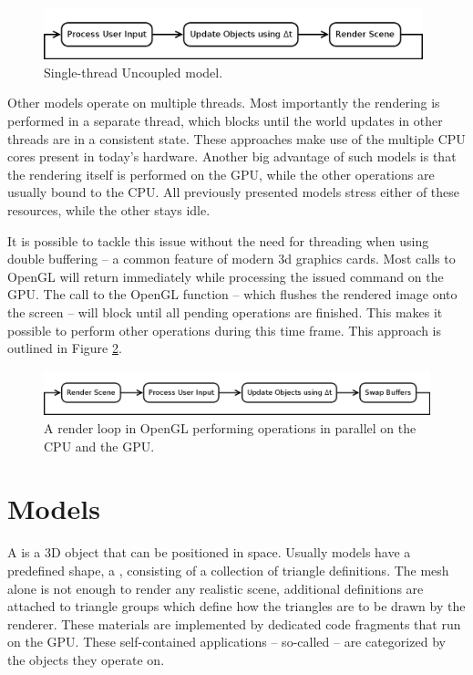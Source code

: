 	\begin{figure}[htbp]
		\centering
		\includegraphics[width=11cm]{images/renderloop-dynamic.png}
		\caption{Single-thread Uncoupled model.}
		\label{fig:RenderLoopDynamic}
	\end{figure}

	Other models operate on multiple threads. Most importantly the rendering is performed in a separate thread, which blocks until the world updates in other threads are in a consistent state. These approaches make use of the multiple CPU cores present in today's hardware. Another big advantage of such models is that the rendering itself is performed on the GPU, while the other operations are usually bound to the CPU. All previously presented models stress either of these resources, while the other stays idle.
	
	It is possible to tackle this issue without the need for threading when using double buffering -- a common feature of modern 3d graphics cards. Most calls to OpenGL will return immediately while processing the issued command on the GPU. The call to the OpenGL function  -- which flushes the rendered image onto the screen -- will block until all pending operations are finished. This makes it possible to perform other operations during this time frame. This approach is outlined in Figure \ref{fig:RenderLoopOpenGL}.

	\begin{figure}[htbp]
		\centering
		\includegraphics[width=13.5cm]{images/renderloop-opengl.png}
		\caption{A render loop in OpenGL performing operations in parallel on the CPU and the GPU.}
		\label{fig:RenderLoopOpenGL}
	\end{figure}

\section{Models}

	A  is a 3D object that can be positioned in space. Usually models have a predefined shape, a , consisting of a collection of triangle definitions. The mesh alone is not enough to render any realistic scene, additional  definitions are attached to triangle groups which define how the triangles are to be drawn by the renderer. These materials are implemented by dedicated code fragments that run on the GPU. These self-contained applications -- so-called  -- are categorized by the objects they operate on\cite{bauchinger-2007-mre}.


